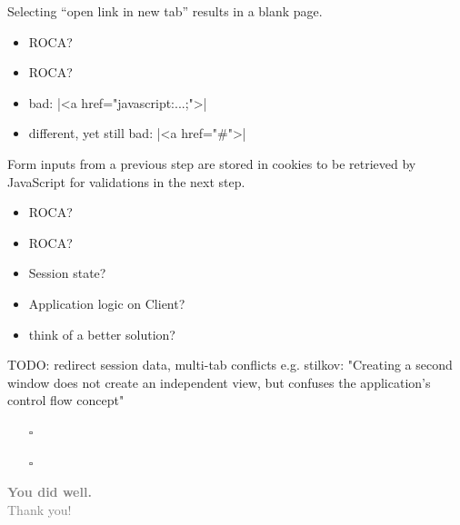 \documentclass{beamer}
\newcommand{\rocafail}{\ding{55}}
\begin{document}
\begin{frame}[fragile]
  Selecting ``open link in new tab'' results in a blank page.

  \vspace{0.3cm}
  \begin{itemize}
    \item<1|only@1>[\Large $\square$] \Large ROCA?
    \item<2|only@2>[\Large \rocafail] \Large ROCA?
    \item<2> bad: |<a href="javascript:...;">|
    \item<2> different, yet still bad: |<a href="#">|
  \end{itemize}
\end{frame}

\begin{frame}
  Form inputs from a previous step are stored in cookies to be retrieved by
  JavaScript for validations in the next step.

  \vspace{0.3cm}
  \begin{itemize}
    \item<1|only@1>[\Large $\square$] \Large ROCA?
    \item<2->[\Large \rocafail] \Large ROCA?
    \item<2-> Session state?
    \item<2-> Application logic on Client?
    \item<3> think of a better solution?
  \end{itemize}

\end{frame}

\begin{frame}
  TODO: redirect session data, multi-tab conflicts
  e.g. stilkov: "Creating a second window does not create an independent view, but confuses the application's control flow concept"

  \vspace{0.3cm}
  \begin{itemize}
    \item[$\square$] 
    \item[$\square$] 
  \end{itemize}

\end{frame}

\begin{frame}
  \vspace*{-2cm}
  \textcolor{gray}{
    \begin{center}
      \textbf{ \fontsize{50}{80} \selectfont You did well. \\ }
      {\fontsize{30}{30} \selectfont Thank you!}
    \end{center}
  }
\end{frame}
\end{document}
